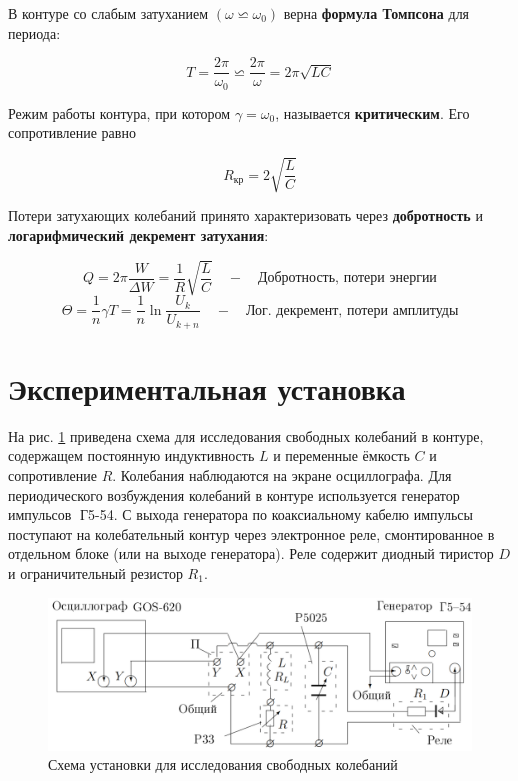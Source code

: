 \documentclass[a4paper,14pt]{article}
\begin{document}
В контуре со слабым затуханием $ (\omega \backsimeq \omega_0) $ верна \textbf{формула Томпсона} для периода: 

\begin{equation*}\label{}
T = \dfrac{2\pi}{\omega_0} \backsimeq  \dfrac{2\pi}{\omega} = 2\pi\sqrt{LC}
\end{equation*}

Режим работы контура, при котором $ \gamma = \omega_0 $, называется \textbf{критическим}. Его сопротивление равно 

\begin{equation}\label{Rkr}
R_\text{кр} = 2\sqrt{\dfrac{L}{C}}
\end{equation}

Потери затухающих колебаний принято характеризовать через \textbf{добротность} и \textbf{логарифмический декремент затухания}: 

\begin{equation}\label{Q}
Q = 2\pi \dfrac{W}{\Delta W} = \dfrac{1}{R} \sqrt{\dfrac{L}{C}} \quad - \quad \text{Добротность, потери энергии}
\end{equation}
\begin{equation}\label{theta}
\Theta = \dfrac{1}{n} \gamma T = \dfrac{1}{n} \ln \dfrac{U_k}{U_{k+n}}  \quad - \quad \text{Лог. декремент, потери амплитуды}
\end{equation}



\section*{Экспериментальная установка}
На рис. \ref{scheme} приведена схема для исследования
свободных колебаний в контуре, содержащем постоянную индуктивность $L$ и переменные ёмкость $C$ и сопротивление $R$. Колебания наблюдаются на экране осциллографа.
Для периодического возбуждения колебаний в контуре используется генератор
импульсов Г5-54. С выхода генератора по коаксиальному кабелю импульсы поступают на колебательный контур через электронное реле, смонтированное в отдельном блоке (или на выходе генератора). Реле содержит диодный тиристор $D$
и ограничительный резистор $R_1$.


\begin{center}
	\begin{figure}[bhtp]
		\centering
		\includegraphics[width=0.7\linewidth]{scheme.png}
		\caption{Схема установки для исследования свободных колебаний}
		\label{scheme}
	\end{figure}
\end{center}
\end{document}
